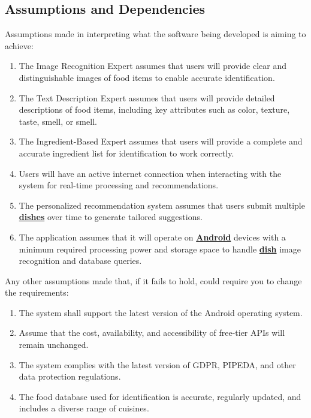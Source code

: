 \documentclass[]{article}
\begin{document}
\subsection{Assumptions and Dependencies}
\label{sub:assumptions_and_dependencies}
Assumptions made in interpreting what the software being developed is aiming to achieve:
	\begin{enumerate}
		\item The Image Recognition Expert assumes that users will provide clear and distinguishable images of food items to enable accurate identification.
		\item The Text Description Expert assumes that users will provide detailed descriptions of food items, including key attributes such as color, texture, taste, smell, or smell.
		\item The Ingredient-Based Expert assumes that users will provide a complete and accurate ingredient list for identification to work correctly.
		\item Users will have an active internet connection when interacting with the system for real-time processing and recommendations.
		\item The personalized recommendation system assumes that users submit multiple \hyperref[Dish]{\textbf{dishes}} over time to generate tailored suggestions.
		\item The application assumes that it will operate on \hyperref[Android]{\textbf{Android}} devices with a minimum required processing power and storage space to handle \hyperref[Dish]{\textbf{dish}} image recognition and database queries.
	\end{enumerate}

Any other assumptions made that, if it fails to hold, could require you to change the requirements:
	\begin{enumerate}
		\item The system shall support the latest version of the Android operating system.
		\item Assume that the cost, availability, and accessibility of free-tier APIs will remain unchanged.
		\item The system complies with the latest version of GDPR, PIPEDA, and other data protection regulations.
		\item The food database used for identification is accurate, regularly updated, and includes a diverse range of cuisines.
	\end{enumerate}

\end{document}
